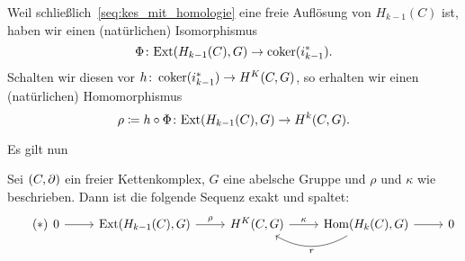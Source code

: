 \begin{vorbereitung}
  Weil schließlich~\eqref{seq:kes_mit_homologie} eine freie Auflösung von $H_{k-1}(C)$ ist, haben wir einen (natürlichen) Isomorphismus
  \begin{equation*}
    \Phi\colon \mathrm{Ext}(H_{k-1}(C),G) \to \operatorname{coker}(i_{k-1}^*).
  \end{equation*}
  Schalten wir diesen vor $h \colon \operatorname{coker}(i_{k-1}^*) \to H^K(C,G)$, so erhalten wir einen (natürlichen) Homomorphismus
  \begin{equation*}
    \rho \coloneqq h \circ \Phi \colon \mathrm{Ext}(H_{k-1}(C),G) \to H^k(C,G).
  \end{equation*}
\end{vorbereitung}
Es gilt nun
\begin{satz}
  Sei $(C,\partial)$ ein freier Kettenkomplex, $G$ eine abelsche Gruppe und $\rho$ und $\kappa$ wie beschrieben.
  Dann ist die folgende Sequenz exakt und spaltet:
  \begin{equation*}
    \label{seq:koeffiziententheorem}
    \tag{$\ast$}
    \begin{tikzcd}
      0 \arrow{r}{}
      & \Ext(H_{k-1}(C),G) \arrow{r}{\rho}
      & H^K(C,G) \arrow{r}{\kappa}
      & \Hom(H_k(C), G) \arrow{r}{} \arrow[bend left]{l}{r}
      & 0
    \end{tikzcd}
  \end{equation*}
\end{satz}
